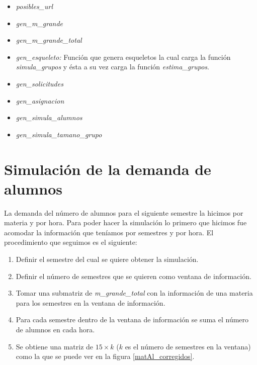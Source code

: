 \begin{itemize}
\item \textit{posibles\_url}

\item \textit{gen\_m\_grande}

\item \textit{gen\_m\_grande\_total}

\item \textit{gen\_esqueleto: } Función que genera esqueletos la cual carga la función \textit{simula\_grupos} y ésta a su vez carga la función \textit{estima\_grupos}.

\item \textit{gen\_solicitudes}

\item \textit{gen\_asignacion}

\item \textit{gen\_simula\_alumnos}

\item \textit{gen\_simula\_tamano\_grupo}
\end{itemize}


\section{Simulación de la demanda de alumnos}

La demanda del número de alumnos para el siguiente semestre la hicimos por materia y por hora. Para poder hacer la simulación lo primero que hicimos fue acomodar la información que teníamos por semestres y por hora. El procedimiento que seguimos es el siguiente:

\begin{enumerate}
\item Definir el semestre del cual se quiere obtener la simulación.

\item Definir el número de semestres que se quieren como ventana de información.

\item Tomar una submatriz de \textit{m\_grande\_total} con la información de una materia para los semestres en la ventana de información.

\item Para cada semestre dentro de la ventana de información se suma el número de alumnos en cada hora.

\item Se obtiene una matriz de $15 \times k$ ($k$ es el número de semestres en la ventana) como la que se puede ver en la figura \ref{matAl_corregidos}.
\end{enumerate}


